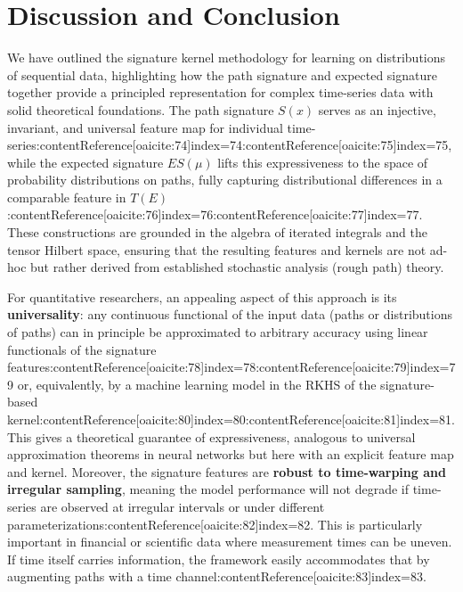 \documentclass[11pt]{article}
\begin{document}
\section{Discussion and Conclusion}
We have outlined the signature kernel methodology for learning on distributions of sequential data, highlighting how the path signature and expected signature together provide a principled representation for complex time-series data with solid theoretical foundations. The path signature $S(x)$ serves as an injective, invariant, and universal feature map for individual time-series:contentReference[oaicite:74]{index=74}:contentReference[oaicite:75]{index=75}, while the expected signature $ES(\mu)$ lifts this expressiveness to the space of probability distributions on paths, fully capturing distributional differences in a comparable feature in $T(E)$:contentReference[oaicite:76]{index=76}:contentReference[oaicite:77]{index=77}. These constructions are grounded in the algebra of iterated integrals and the tensor Hilbert space, ensuring that the resulting features and kernels are not ad-hoc but rather derived from established stochastic analysis (rough path) theory.

For quantitative researchers, an appealing aspect of this approach is its \textbf{universality}: any continuous functional of the input data (paths or distributions of paths) can in principle be approximated to arbitrary accuracy using linear functionals of the signature features:contentReference[oaicite:78]{index=78}:contentReference[oaicite:79]{index=79} or, equivalently, by a machine learning model in the RKHS of the signature-based kernel:contentReference[oaicite:80]{index=80}:contentReference[oaicite:81]{index=81}. This gives a theoretical guarantee of expressiveness, analogous to universal approximation theorems in neural networks but here with an explicit feature map and kernel. Moreover, the signature features are \textbf{robust to time-warping and irregular sampling}, meaning the model performance will not degrade if time-series are observed at irregular intervals or under different parameterizations:contentReference[oaicite:82]{index=82}. This is particularly important in financial or scientific data where measurement times can be uneven. If time itself carries information, the framework easily accommodates that by augmenting paths with a time channel:contentReference[oaicite:83]{index=83}.
\end{document}
